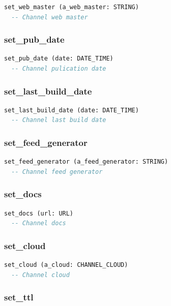 \begin{lstlisting}[language=Eiffel]
set_web_master (a_web_master: STRING)
  -- Channel web master
\end{lstlisting}

\subsubsection{set\_pub\_date}

\begin{lstlisting}[language=Eiffel]
set_pub_date (date: DATE_TIME)
  -- Channel pulication date
\end{lstlisting}

\subsubsection{set\_last\_build\_date}

\begin{lstlisting}[language=Eiffel]
set_last_build_date (date: DATE_TIME)
  -- Channel last build date
\end{lstlisting}

\subsubsection{set\_feed\_generator}

\begin{lstlisting}[language=Eiffel]
set_feed_generator (a_feed_generator: STRING)
  -- Channel feed generator
\end{lstlisting}

\subsubsection{set\_docs}

\begin{lstlisting}[language=Eiffel]
set_docs (url: URL)
  -- Channel docs
\end{lstlisting}

\subsubsection{set\_cloud}

\begin{lstlisting}[language=Eiffel]
set_cloud (a_cloud: CHANNEL_CLOUD)
  -- Channel cloud
\end{lstlisting}

\subsubsection{set\_ttl}

